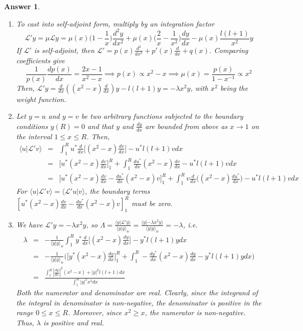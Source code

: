 \documentclass[a4paper]{article}
\newtheorem{ans}{Answer}[section]
\theoremstyle{new}
\begin{document}
\begin{ans}\leavevmode
\begin{enumerate}[label=(\roman*)]
\item To cast into self-adjoint form, multiply by an integration factor
$$\mathcal{L}'y=\mu\mathcal{L}y=\mu(x)\bigg(1-\frac{1}{x}\bigg)\frac{d^2y}{dx^2}+\mu(x)\bigg(\frac{2}{x}-\frac{1}{x^2}\bigg)\frac{dy}{dx}-\mu(x)\frac{l(l+1)}{x^2}y$$
If $\mathcal{L}'$ is self-adjoint, then $\mathcal{L}'=p(x)\frac{d^2}{dx^2}+p'(x)\frac{d}{dx}+q(x)$. Comparing coefficients give
$$\frac{1}{p(x)}\frac{dp(x)}{dx}=\frac{2x-1}{x^2-x}\implies p(x)\propto x^2-x\implies\mu(x)=\frac{p(x)}{1-x^{-1}}\propto x^2$$
Then, $\mathcal{L}'y=\frac{d}{dx}((x^2-x)\frac{d}{dx})y-l(l+1)y=-\lambda x^2y$, with $x^2$ being the weight function.
\item Let $y=u$ and $y=v$ be two arbitrary functions subjected to the boundary conditions $y(R)=0$ and that $y$ and $\frac{dy}{dx}$ are bounded from above as $x\rightarrow 1$ on the interval $1\leq x\leq R$. Then,
\begin{eqnarray}
\langle u|\mathcal{L}'v\rangle&=&\int_1^Ru^*\frac{d}{dx}\bigg[(x^2-x)\frac{dv}{dx}\bigg]-u^*l(l+1)vdx\nonumber\\&=&\bigg[u^*(x^2-x)\frac{dv}{dx}\bigg]_1^R+\int_1^R\frac{du^*}{dx}(x^2-x)\frac{dv}{dx}-u^*l(l+1)vdx\nonumber\\&=&\bigg[u^*(x^2-x)\frac{dv}{dx}-\frac{du^*}{dx}(x^2-x)v\bigg]^R_1+\int_1^Rv\frac{d}{dx}\bigg((x^2-x)\frac{du^*}{dx}\bigg)-u^*l(l+1)vdx\nonumber
\end{eqnarray}
For $\langle u|\mathcal{L}'v\rangle=\langle\mathcal{L}'u|v\rangle$, the boundary terms $[u^*(x^2-x)\frac{dv}{dx}-\frac{du^*}{dx}(x^2-x)v]_1^R$ must be zero.
\item We have $\mathcal{L}'y=-\lambda x^2y$, so $\Lambda=\frac{\langle y|\mathcal{L'}y\rangle}{\langle y|y\rangle_w}=\frac{\langle y|-\lambda x^2y\rangle}{\langle y|y\rangle_w}=-\lambda$, i.e.
\begin{eqnarray}
\lambda&=&-\frac{1}{\langle y|y\rangle_w}\int_1^Ry^*\frac{d}{dx}\bigg[(x^2-x)\frac{dy}{dx}\bigg]-y^*l(l+1)ydx\nonumber\\&=&-\frac{1}{\langle y|y\rangle_w}\bigg(\bigg[y^*(x^2-x)\frac{dy}{dx}\bigg]_1^R+\int_1^R-\frac{dy^*}{dx}(x^2-x)\frac{dy}{dx}-y^*l(l+1)ydx\bigg)\nonumber\\&=&\frac{\int_1^R|\frac{dy}{dx}|^2(x^2-x)+|y|^2l(l+1)dx}{\int_1^R|y|^2x^2dx}\nonumber
\end{eqnarray}
Both the numerator and denominator are real. Clearly, since the integrand of the integral in denominator is non-negative, the denominator is positive in the range $0\leq x\leq R$. Moreover, since $x^2\geq x$, the numerator is non-negative. Thus, $\lambda$ is positive and real.

\end{enumerate}
\end{ans}
\end{document}
